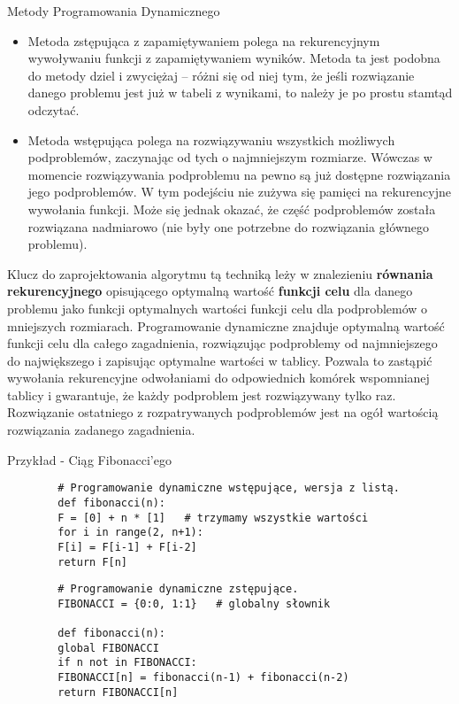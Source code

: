 \documentclass[main.tex]{subfiles}
\begin{document}
    Metody Programowania Dynamicznego
    \begin{itemize}
        \item Metoda zstępująca z zapamiętywaniem polega na rekurencyjnym wywoływaniu funkcji z zapamiętywaniem wyników. Metoda ta jest podobna do metody dziel i zwyciężaj – różni się od niej tym, że jeśli rozwiązanie danego problemu jest już w tabeli z wynikami, to należy je po prostu stamtąd odczytać.
        \item Metoda wstępująca polega na rozwiązywaniu wszystkich możliwych podproblemów, zaczynając od tych o najmniejszym rozmiarze. Wówczas w momencie rozwiązywania podproblemu na pewno są już dostępne rozwiązania jego podproblemów. W tym podejściu nie zużywa się pamięci na rekurencyjne wywołania funkcji. Może się jednak okazać, że część podproblemów została rozwiązana nadmiarowo (nie były one potrzebne do rozwiązania głównego problemu).
    \end{itemize}

    Klucz do zaprojektowania algorytmu tą techniką leży w znalezieniu \textbf{równania rekurencyjnego} opisującego optymalną wartość \textbf{funkcji celu} dla danego problemu jako funkcji optymalnych wartości funkcji celu dla podproblemów o mniejszych rozmiarach. Programowanie dynamiczne znajduje optymalną wartość funkcji celu dla całego zagadnienia, rozwiązując podproblemy od najmniejszego do największego i zapisując optymalne wartości w tablicy. Pozwala to zastąpić wywołania rekurencyjne odwołaniami do odpowiednich komórek wspomnianej tablicy i gwarantuje, że każdy podproblem jest rozwiązywany tylko raz. Rozwiązanie ostatniego z rozpatrywanych podproblemów jest na ogół wartością rozwiązania zadanego zagadnienia.

    Przykład - Ciąg Fibonacci'ego

    \begin{verbatim}
        # Programowanie dynamiczne wstępujące, wersja z listą.
        def fibonacci(n):
        F = [0] + n * [1]   # trzymamy wszystkie wartości
        for i in range(2, n+1):
        F[i] = F[i-1] + F[i-2]
        return F[n]
    \end{verbatim}

    \begin{verbatim}
        # Programowanie dynamiczne zstępujące.
        FIBONACCI = {0:0, 1:1}   # globalny słownik

        def fibonacci(n):
        global FIBONACCI
        if n not in FIBONACCI:
        FIBONACCI[n] = fibonacci(n-1) + fibonacci(n-2)
        return FIBONACCI[n]
    \end{verbatim}
\end{document}
